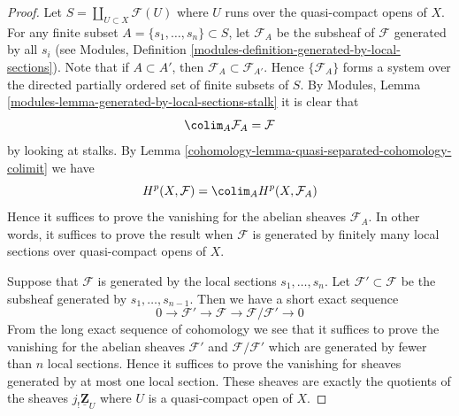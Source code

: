 \begin{proof}

Let $S = \coprod_{U \subset X} \mathcal{F}(U)$ where $U$ runs over the
quasi-compact opens of $X$.
For any finite subset $A = \{s_1, \ldots, s_n\} \subset S$,
let $\mathcal{F}_A$ be the subsheaf of $\mathcal{F}$ generated
by all $s_i$ (see
Modules, Definition \ref{modules-definition-generated-by-local-sections}).
Note that if $A \subset A'$, then $\mathcal{F}_A \subset \mathcal{F}_{A'}$.
Hence $\{\mathcal{F}_A\}$ forms a system over the
directed partially ordered set of finite subsets of $S$.
By Modules, Lemma \ref{modules-lemma-generated-by-local-sections-stalk}
it is clear that
$$
\colim_A \mathcal{F}_A = \mathcal{F}
$$
by looking at stalks. By
Lemma \ref{cohomology-lemma-quasi-separated-cohomology-colimit} we have
$$
H^p(X, \mathcal{F}) =
\colim_A H^p(X, \mathcal{F}_A)
$$
Hence it suffices to prove the vanishing for the abelian sheaves
$\mathcal{F}_A$. In other words, it suffices to prove the
result when $\mathcal{F}$ is generated by finitely many local sections
over quasi-compact opens of $X$.

\medskip\noindent
Suppose that $\mathcal{F}$ is generated by the local sections
$s_1, \ldots, s_n$. Let $\mathcal{F}' \subset \mathcal{F}$
be the subsheaf generated by $s_1, \ldots, s_{n - 1}$.
Then we have a short exact sequence
$$
0 \to \mathcal{F}' \to \mathcal{F} \to \mathcal{F}/\mathcal{F}' \to 0
$$
From the long exact sequence of cohomology we see that it suffices
to prove the vanishing for the abelian sheaves $\mathcal{F}'$
and $\mathcal{F}/\mathcal{F}'$ which are generated by fewer than
$n$ local sections. Hence it suffices to prove the vanishing
for sheaves generated by at most one local section. These sheaves
are exactly the quotients of the sheaves $j_!\underline{\mathbf{Z}}_U$
where $U$ is a quasi-compact open of $X$.


\end{proof}
